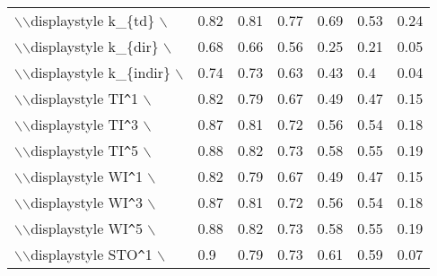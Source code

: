 \begin{table}[ht]
\begin{tabular}{lllllll}
  $\backslash$$\backslash$displaystyle k\_\{td\} $\backslash$} & {\color[HTML]{EF2A00} 0.82} & {\color[HTML]{00D768} 0.81} & {\color[HTML]{0051D7} 0.77} & {\color[HTML]{6200D7} 0.69} & {\color{orange} 0.53} & {\color[HTML]{9B9B9B} 0.24} \\ 
  $\backslash$$\backslash$displaystyle k\_\{dir\} $\backslash$} & {\color[HTML]{00D768} 0.68} & {\color[HTML]{EF2A00} 0.66} & {\color[HTML]{0051D7} 0.56} & {\color{orange} 0.25} & {\color[HTML]{6200D7} 0.21} & {\color[HTML]{9B9B9B} 0.05} \\ 
  $\backslash$$\backslash$displaystyle k\_\{indir\} $\backslash$} & {\color[HTML]{EF2A00} 0.74} & {\color[HTML]{00D768} 0.73} & {\color[HTML]{0051D7} 0.63} & {\color[HTML]{6200D7} 0.43} & {\color{orange} 0.4} & {\color[HTML]{9B9B9B} 0.04} \\ 
  $\backslash$$\backslash$displaystyle TI\verb|^|1 $\backslash$} & {\color[HTML]{EF2A00} 0.82} & {\color[HTML]{00D768} 0.79} & {\color[HTML]{0051D7} 0.67} & {\color[HTML]{6200D7} 0.49} & {\color{orange} 0.47} & {\color[HTML]{9B9B9B} 0.15} \\ 
  $\backslash$$\backslash$displaystyle TI\verb|^|3 $\backslash$} & {\color[HTML]{EF2A00} 0.87} & {\color[HTML]{00D768} 0.81} & {\color[HTML]{0051D7} 0.72} & {\color{orange} 0.56} & {\color[HTML]{6200D7} 0.54} & {\color[HTML]{9B9B9B} 0.18} \\ 
  $\backslash$$\backslash$displaystyle TI\verb|^|5 $\backslash$} & {\color[HTML]{EF2A00} 0.88} & {\color[HTML]{00D768} 0.82} & {\color[HTML]{0051D7} 0.73} & {\color{orange} 0.58} & {\color[HTML]{6200D7} 0.55} & {\color[HTML]{9B9B9B} 0.19} \\ 
  $\backslash$$\backslash$displaystyle WI\verb|^|1 $\backslash$} & {\color[HTML]{EF2A00} 0.82} & {\color[HTML]{00D768} 0.79} & {\color[HTML]{0051D7} 0.67} & {\color[HTML]{6200D7} 0.49} & {\color{orange} 0.47} & {\color[HTML]{9B9B9B} 0.15} \\ 
  $\backslash$$\backslash$displaystyle WI\verb|^|3 $\backslash$} & {\color[HTML]{EF2A00} 0.87} & {\color[HTML]{00D768} 0.81} & {\color[HTML]{0051D7} 0.72} & {\color{orange} 0.56} & {\color[HTML]{6200D7} 0.54} & {\color[HTML]{9B9B9B} 0.18} \\ 
  $\backslash$$\backslash$displaystyle WI\verb|^|5 $\backslash$} & {\color[HTML]{EF2A00} 0.88} & {\color[HTML]{00D768} 0.82} & {\color[HTML]{0051D7} 0.73} & {\color{orange} 0.58} & {\color[HTML]{6200D7} 0.55} & {\color[HTML]{9B9B9B} 0.19} \\ 
  $\backslash$$\backslash$displaystyle STO\verb|^|1 $\backslash$} & {\color[HTML]{00D768} 0.9} & {\color[HTML]{EF2A00} 0.79} & {\color[HTML]{0051D7} 0.73} & {\color{orange} 0.61} & {\color[HTML]{6200D7} 0.59} & {\color[HTML]{9B9B9B} 0.07} \\ 

\end{tabular}
\end{table}
